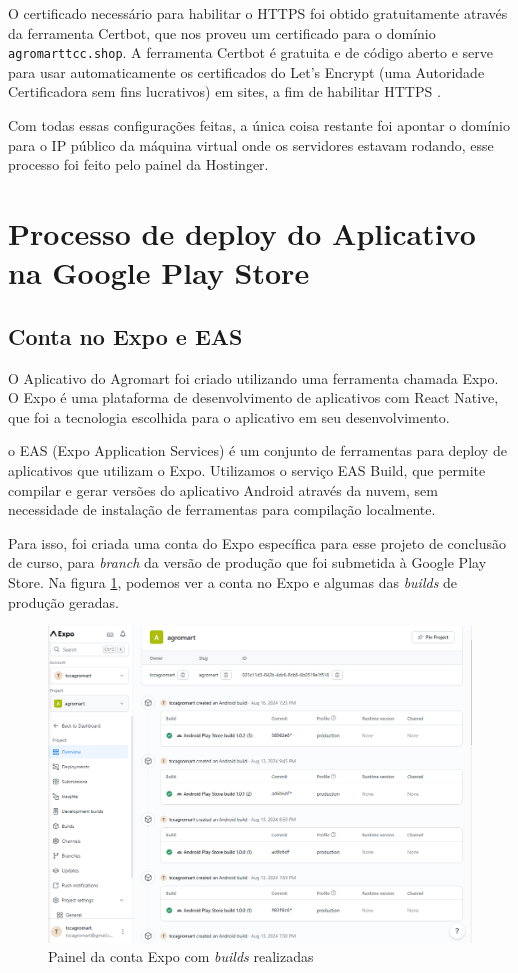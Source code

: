 O certificado necessário para habilitar o HTTPS foi obtido gratuitamente através da ferramenta Certbot, que nos proveu um certificado para o domínio \texttt{agromarttcc.shop}. A ferramenta Certbot é gratuita e de código aberto e serve para usar automaticamente os certificados do Let's Encrypt (uma Autoridade Certificadora sem fins lucrativos) em sites, a fim de habilitar HTTPS \cite{cerbot2024}.

 Com todas essas configurações feitas, a única coisa restante foi apontar o domínio para o IP público da máquina virtual onde os servidores estavam rodando, esse processo foi feito pelo painel da Hostinger.

\section{Processo de deploy do Aplicativo na Google Play Store}

\subsection{Conta no Expo e EAS}
O Aplicativo do Agromart foi criado utilizando uma ferramenta chamada Expo. O Expo é uma plataforma de desenvolvimento de aplicativos com React Native, que foi a tecnologia escolhida para o aplicativo em seu desenvolvimento.

o EAS (Expo Application Services) é um conjunto de ferramentas para deploy de aplicativos que utilizam o Expo. Utilizamos o serviço EAS Build, que permite compilar e gerar versões do aplicativo Android através da nuvem, sem necessidade de instalação de ferramentas para compilação localmente.

Para isso, foi criada uma conta do Expo específica para esse projeto de conclusão de curso, para \textit{branch} da versão de produção que foi submetida à Google Play Store. Na figura \ref{expo}, podemos ver a conta no Expo e algumas das \textit{builds} de produção geradas.

\begin{figure}[h]
	\centering
\includegraphics[keepaspectratio=true,scale=0.35]{figuras/expo.png}
	\caption{Painel da conta Expo com \textit{builds} realizadas}
	\label{expo}
\end{figure}

